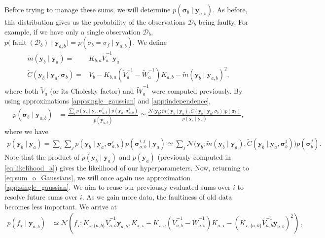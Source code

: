 \documentclass{article} %
\newcommand{\deq}{=}
\newcommand{\given}{\!\ensuremath{\mid}\!}
\newcommand{\cm}[1]{\ensuremath{\mathcal{#1}}}
\newcommand{\bm}[1]{\ensuremath{\mathbf{#1}}}
\newcommand{\data}{\ensuremath{\cm{D}}}
\newcommand{\vect}[1]{\bm{#1}}
\newcommand{\vy}{\vect{y}}
\newcommand{\vs}{\vect{\sigma}}
\newcommand{\amean}[2]{\tilde{{m}}(#1 \given #2 )}
\newcommand{\acov}[2]{\tilde{{C}}(#1 \given #2 )}
\newcommand{\p}[2]{p(#1\given#2)}
\newcommand{\fPr}{p}
\newcommand{\Prob}[2]{\fPr(#1 \given #2 )}
\newcommand{\ps}[2]{p(#1\vert#2)}
\newcommand{\N}[3]{\cm{N}( #1;#2,#3 )}
\newcommand{\st}{_{\star}}
\DeclareMathOperator{\fault}{fault}
\begin{document}
Before trying to manage these sums, we will determine $p(\vs_b \given \vy_{a,b})$. As before, this distribution gives us the probability
of the observations $\data_b$ being faulty. For example, if we have
only a single observation $\data_b$, $
p\bigl(\fault(\data_b) \given \vy_{a,b}\bigr) = \Prob{\sigma_b =
  \sigma_f}{\vy_{a,b}} $. We define
\begin{align*}%
\amean{\vy_b}{\vy_a} \deq {} &
K_{b,a} \tilde{V}_a^{-1} \vy_a %
\\
\acov{\vy_b}{\vy_{a},\vs_b}
\deq {} & V_b - K_{b,a}(\tilde{V}_a^{-1}-\tilde{W}_a^{-1})K_{a,b}
 - \amean{\vy_b}{\vy_{a,b}}^2, %
\end{align*}
where both $\tilde{V}_a$ (or its Cholesky factor) and
$\tilde{W}_a^{-1}$ were computed previously. By using
approximations \ref{app:single_gaussian} and \ref{app:independence},
\begin{align*}
\Prob{\vs_b}{\vy_{a,b}} & = \frac{\sum_i \p{\vy_b}{\vy_a,\vs^i_{a,b}}p(\vy_a,\vs^i_{a,b})}{p(\vy_{a,b})} 
\simeq \frac{\cm{N}\bigl(\vy_b; \amean{\vy_b}{\vy_a}, \acov{\vy_b}{\vy_a, \sigma_b}\bigr) \fPr(\vs_b)}{\p{\vy_{b}}{\vy_a}},%
\end{align*}
where we have
\begin{align*}
p(\vy_{b} \given \vy_a)
 = \sum_i \sum_j \p{\vy_b}{\vy_a,\vs^i_{a,b}}\Prob{\vs^{i,j}_{a,b}}{\vy_a}
 \simeq \sum_j \cm{N}\bigl(\vy_b; \amean{\vy_b}{\vy_a}, \acov{\vy_b}{\vy_a, \vs_b^j}\bigr) \fPr(\vs_b^j).%
\end{align*}
Note that the product of $p(\vy_{b} \given \vy_a)$ and $p(\vy_a)$ (previously computed in
\eqref{eq:likelihood_a}) gives the likelihood of our hyperparameters. Now, returning to \eqref{eq:sum_o_Gaussians}, we will once again
use approximation \ref{app:single_gaussian}. We aim to reuse our previously evaluated sums over
$i$ to resolve future sums over $i$. As we gain more data, the
faultiness of old data becomes less important. We arrive at
\begin{align*}
\p{f\st}{\vy_{a,b}} & \simeq \N{f\st}{K_{\star,\{a,b\}} \tilde{V}_{a,b}^{-1} \vy_{a,b}}{K_{\star,\star} - K_{\star,a}(\tilde{V}_{a,b}^{-1}-\tilde{W}_{a,b}^{-1})K_{a,\star} - (K_{\star,\{a,b\}} \tilde{V}_{a,b}^{-1} \vy_{a,b})^2}\,,%
\end{align*}
\end{document}
